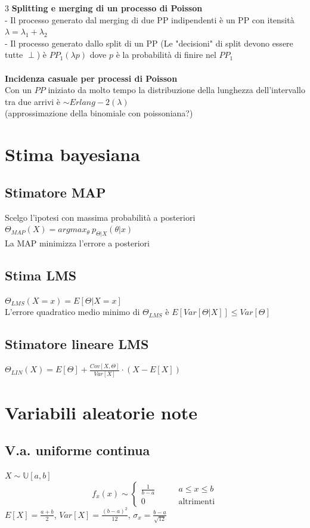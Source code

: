 \documentclass{article}
\begin{document}
\begin{multicols*}{3}
		\textbf{Splitting e merging di un processo di Poisson}\\
		- Il processo generato dal merging di due PP indipendenti è un PP con itensità \(\lambda = \lambda_1 + \lambda_2\)\\
		- Il processo generato dallo split di un PP (Le "decisioni" di split devono essere tutte \(\perp\)) è \(PP_1(\lambda p)\) dove \(p\) è la probabilità di finire nel \(PP_1\)\\\\
		\textbf{Incidenza casuale per processi di Poisson}\\
		Con un \(PP\) iniziato da molto tempo la distribuzione della lunghezza dell'intervallo tra due arrivi è \(\sim Erlang-2(\lambda)\)\\
		(approssimazione della binomiale con poissoniana?)
		\section{Stima bayesiana}
		\subsection{Stimatore MAP}
		Scelgo l'ipotesi con massima probabilità a posteriori\\
		\(\Theta_{MAP}(X) = argmax_{\theta}\  p_{\Theta | X} (\theta | x)\)\\
		La MAP minimizza l'errore a posteriori
		\subsection{Stima LMS}
		\(\Theta_{LMS} (X=x) = E[\Theta | X=x]\)\\
		L'errore quadratico medio minimo di \(\Theta_{LMS}\) è \(E[Var[\Theta | X]] \leq Var[\Theta]\)
 		\subsection{Stimatore lineare LMS}
 		\(\Theta_{LIN} (X) = E[\Theta] + \frac{Cov[X,\Theta]}{Var[X]} \cdot (X-E[X])\)\\
		
		
		
		
		\section{Variabili aleatorie note}
		
		\subsection{V.a. uniforme continua}
		\(X \sim \mathbb{U}[a,b] \)\\
		\begin{equation*}
			f_x (x) \sim
			\left\{
			\begin{alignedat}{2}
				\frac{1}{b-a}  & \qquad a\leq x \leq b\\
				0            & \qquad \text{altrimenti}
			\end{alignedat}
			\right.
		\end{equation*}
		\(E[X] = \frac{a+b}{2}\), \(Var[X] = \frac{(b-a)^2}{12}\), \(\sigma_x = \frac{b-a}{\sqrt{12}}\)\\
		

\end{multicols*}
\end{document}
